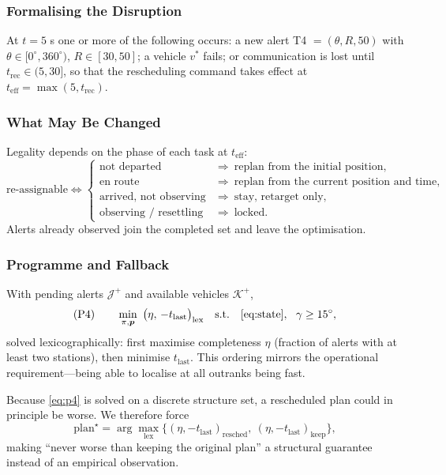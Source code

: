 \documentclass[12pt]{article}
\begin{document}
\subsubsection{Formalising the Disruption}

At $t=5$ s one or more of the following occurs: a new alert T4 $=(\theta,R,50)$ with $\theta\in[0^\circ,360^\circ)$, $R\in[30,50]$; a vehicle $v^\ast$ fails; or communication is lost until $t_{\mathrm{rec}}\in(5,30]$, so that the rescheduling command takes effect at $t_{\mathrm{eff}}=\max(5,t_{\mathrm{rec}})$.

\subsubsection{What May Be Changed}

Legality depends on the phase of each task at $t_{\mathrm{eff}}$:
\begin{equation}
\label{eq:state}
\text{re-assignable}\iff
\begin{cases}
\text{not departed} & \Rightarrow\ \text{replan from the initial position},\\
\text{en route} & \Rightarrow\ \text{replan from the current position and time},\\
\text{arrived, not observing} & \Rightarrow\ \text{stay, retarget only},\\
\text{observing / resettling} & \Rightarrow\ \text{locked}.
\end{cases}
\end{equation}
Alerts already observed join the completed set and leave the optimisation.

\subsubsection{Programme and Fallback}

With pending alerts $\mathcal J^{+}$ and available vehicles $\mathcal K^{+}$,
\begin{equation}
\label{eq:p4}
(\mathrm{P4})\qquad
\min_{\pi,\bm p}\ \big(\eta,\,-t_{\mathrm{last}}\big)_{\mathrm{lex}}
\quad\text{s.t.}\quad \eqref{eq:state},\ \ \gamma\ge15^\circ ,
\end{equation}
solved lexicographically: first maximise completeness $\eta$ (fraction of alerts with at least two stations), then minimise $t_{\mathrm{last}}$. This ordering mirrors the operational requirement---being able to localise at all outranks being fast.

Because \eqref{eq:p4} is solved on a discrete structure set, a rescheduled plan could in principle be worse. We therefore force
\begin{equation}
\label{eq:fallback}
\text{plan}^{\star}=\arg\max_{\mathrm{lex}}\Big\{(\eta,-t_{\mathrm{last}})_{\mathrm{resched}},\ (\eta,-t_{\mathrm{last}})_{\mathrm{keep}}\Big\},
\end{equation}
making ``never worse than keeping the original plan'' a structural guarantee instead of an empirical observation.
\end{document}
